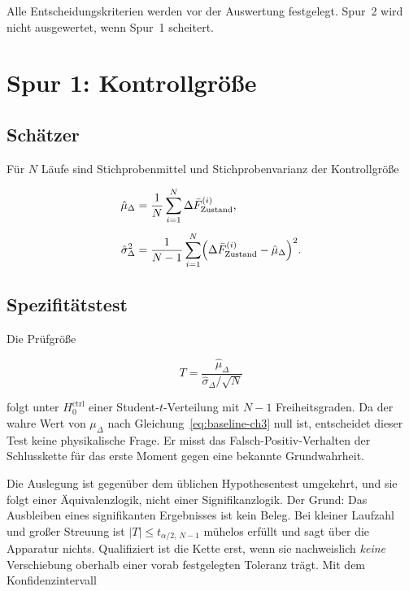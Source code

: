 \documentclass[12pt,a4paper]{report}
\begin{document}
Alle Entscheidungskriterien werden vor der Auswertung festgelegt. Spur~2
wird nicht ausgewertet, wenn Spur~1 scheitert.

\section{Spur 1: Kontrollgröße}

\subsection{Schätzer}

Für $N$ Läufe sind Stichprobenmittel und Stichprobenvarianz der
Kontrollgröße

\begin{align}
  \hat{\mu}_{\Delta} &= \frac{1}{N}\sum_{i=1}^{N}
      \Delta \bar{F}^{(i)}_{\mathrm{Zustand}},
  \label{eq:mu-hat}\\[4pt]
  \hat{\sigma}^{2}_{\Delta} &= \frac{1}{N-1}\sum_{i=1}^{N}
      \Bigl( \Delta \bar{F}^{(i)}_{\mathrm{Zustand}}
             - \hat{\mu}_{\Delta} \Bigr)^{2}.
  \label{eq:sigma-hat}
\end{align}

\subsection{Spezifitätstest}

Die Prüfgröße

\begin{equation}
  T = \frac{\hat{\mu}_{\Delta}}{\hat{\sigma}_{\Delta}/\sqrt{N}}
  \label{eq:t-stat}
\end{equation}

folgt unter $H_{0}^{\mathrm{ctrl}}$ einer Student-$t$-Verteilung mit
$N-1$ Freiheitsgraden. Da der wahre Wert von $\mu_{\Delta}$ nach
Gleichung~\eqref{eq:baseline-ch3} null ist, entscheidet dieser Test keine
physikalische Frage. Er misst das Falsch-Positiv-Verhalten der
Schlusskette für das erste Moment gegen eine bekannte Grundwahrheit.

Die Auslegung ist gegenüber dem üblichen Hypothesentest umgekehrt, und
sie folgt einer Äquivalenzlogik, nicht einer Signifikanzlogik. Der
Grund: Das Ausbleiben eines signifikanten Ergebnisses ist kein Beleg.
Bei kleiner Laufzahl und großer Streuung ist $|T| \leq t_{\alpha/2,\,N-1}$
mühelos erfüllt und sagt über die Apparatur nichts. Qualifiziert ist die
Kette erst, wenn sie nachweislich \emph{keine} Verschiebung oberhalb
einer vorab festgelegten Toleranz trägt. Mit dem Konfidenzintervall
\end{document}
